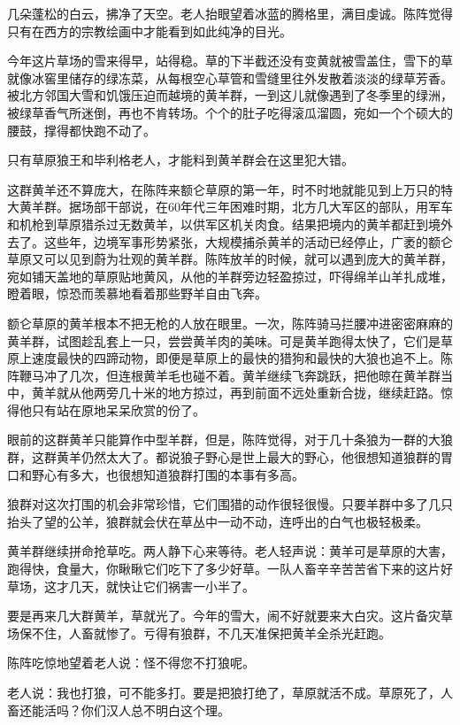 \par 几朵蓬松的白云，拂净了天空。老人抬眼望着冰蓝的腾格里，满目虔诚。陈阵觉得只有在西方的宗教绘画中才能看到如此纯净的目光。
\par 今年这片草场的雪来得早，站得稳。草的下半截还没有变黄就被雪盖住，雪下的草就像冰窖里储存的绿冻菜，从每根空心草管和雪缝里往外发散着淡淡的绿草芳香。被北方邻国大雪和饥饿压迫而越境的黄羊群，一到这儿就像遇到了冬季里的绿洲，被绿草香气所迷倒，再也不肯转场。个个的肚子吃得滚瓜溜圆，宛如一个个硕大的腰鼓，撑得都快跑不动了。
\par 只有草原狼王和毕利格老人，才能料到黄羊群会在这里犯大错。
\par 这群黄羊还不算庞大，在陈阵来额仑草原的第一年，时不时地就能见到上万只的特大黄羊群。据场部干部说，在60年代三年困难时期，北方几大军区的部队，用军车和机枪到草原猎杀过无数黄羊，以供军区机关肉食。结果把境内的黄羊都赶到境外去了。这些年，边境军事形势紧张，大规模捕杀黄羊的活动已经停止，广袤的额仑草原又可以见到蔚为壮观的黄羊群。陈阵放羊的时候，就可以遇到庞大的黄羊群，宛如铺天盖地的草原贴地黄风，从他的羊群旁边轻盈掠过，吓得绵羊山羊扎成堆，瞪着眼，惊恐而羡慕地看着那些野羊自由飞奔。
\par 额仑草原的黄羊根本不把无枪的人放在眼里。一次，陈阵骑马拦腰冲进密密麻麻的黄羊群，试图趁乱套上一只，尝尝黄羊肉的美味。可是黄羊跑得太快了，它们是草原上速度最快的四蹄动物，即便是草原上的最快的猎狗和最快的大狼也追不上。陈阵鞭马冲了几次，但连根黄羊毛也碰不着。黄羊继续飞奔跳跃，把他晾在黄羊群当中，黄羊就从他两旁几十米的地方掠过，再到前面不远处重新合拢，继续赶路。惊得他只有站在原地呆呆欣赏的份了。
\par 眼前的这群黄羊只能算作中型羊群，但是，陈阵觉得，对于几十条狼为一群的大狼群，这群黄羊仍然太大了。都说狼子野心是世上最大的野心，他很想知道狼群的胃口和野心有多大，也很想知道狼群打围的本事有多高。
\par 狼群对这次打围的机会非常珍惜，它们围猎的动作很轻很慢。只要羊群中多了几只抬头了望的公羊，狼群就会伏在草丛中一动不动，连呼出的白气也极轻极柔。
\par 黄羊群继续拼命抢草吃。两人静下心来等待。老人轻声说：黄羊可是草原的大害，跑得快，食量大，你瞅瞅它们吃下了多少好草。一队人畜辛辛苦苦省下来的这片好草场，这才几天，就快让它们祸害一小半了。
\par 要是再来几大群黄羊，草就光了。今年的雪大，闹不好就要来大白灾。这片备灾草场保不住，人畜就惨了。亏得有狼群，不几天准保把黄羊全杀光赶跑。
\par 陈阵吃惊地望着老人说：怪不得您不打狼呢。
\par 老人说：我也打狼，可不能多打。要是把狼打绝了，草原就活不成。草原死了，人畜还能活吗？你们汉人总不明白这个理。
